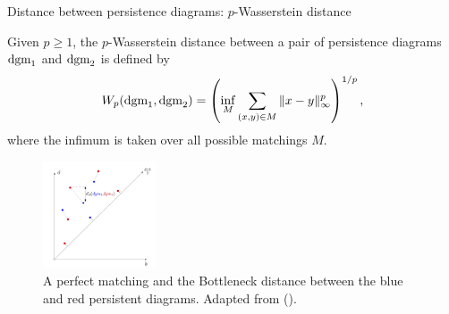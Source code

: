 \documentclass[xcolor={dvipsnames,svgnames}]{beamer}
\begin{document}
\begin{frame}{Distance between persistence diagrams: $p$-Wasserstein distance}
    
\begin{defn}
Given $p\geq 1$, the $p$-Wasserstein distance between a pair of persistence diagrams $\text{dgm}_1$ and $\text{dgm}_2$ is defined by 
\begin{align}
    W_p(\text{dgm}_1, \text{dgm}_2) = \left(\inf_M \sum_{(x,y)\in M}\|x-y\|^p_\infty\right)^{1/p},
\end{align}
where the infimum is taken over all possible matchings $M$.
\end{defn}
   \begin{figure}[H]
   \label{matching}
        \centering \includegraphics[width=0.3\textwidth]{figures/matching.png}
            \caption{\scriptsize A perfect matching and the Bottleneck distance between the blue and red persistent diagrams. Adapted from (\cite{chazal_introduction_2021}).} \label{fig:perfect-matching}
    \end{figure}
\end{frame}
\end{document}
